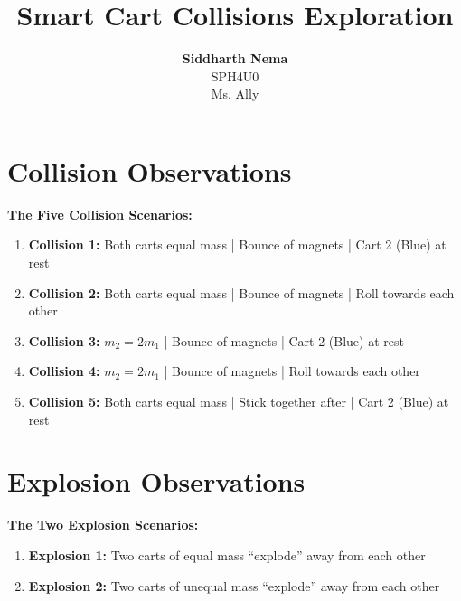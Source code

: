 \documentclass[12pt,letterpaper]{article}
\title{\textbf{Smart Cart Collisions Exploration}}
\author{\textbf{Siddharth Nema}\\SPH4U0 \\Ms.\hspace{-1mm} Ally}
\begin{document}
\maketitle
\newpage

\section{Collision Observations}
\textbf{The Five Collision Scenarios:}
\vspace{-4mm}
\begin{enumerate}
	\itemsep-0.75em
	\item \textbf{Collision 1:} Both carts equal mass | Bounce of magnets | Cart 2 (Blue) at rest
	\item \textbf{Collision 2:} Both carts equal mass | Bounce of magnets | Roll towards each other
	\item \textbf{Collision 3:} $m_{2} = 2m_{1}$ | Bounce of magnets | Cart 2 (Blue) at rest
	\item \textbf{Collision 4:} $m_{2} = 2m_{1}$ | Bounce of magnets | Roll towards each other
	\item \textbf{Collision 5:} Both carts equal mass | Stick together after | Cart 2 (Blue) at rest
\end{enumerate}



\newpage
\section{Explosion Observations}
\textbf{The Two Explosion Scenarios:}
\vspace{-4mm}
\begin{enumerate}
	\itemsep-0.75em
	\item \textbf{Explosion 1:} Two carts of equal mass “explode” away from each other
	\item \textbf{Explosion 2:} Two carts of unequal mass “explode” away from each other
\end{enumerate}


\vspace{-6mm}
\end{document}
